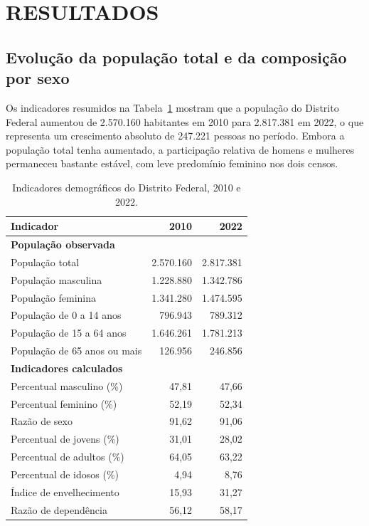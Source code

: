 \documentclass[a4paper,12pt]{article}
\begin{document}
\section{RESULTADOS}



\subsection{Evolução da população total e da composição por sexo}

Os indicadores resumidos na Tabela~\ref{tab:indicadores_df} mostram que a
população do Distrito Federal aumentou de 2.570.160 habitantes em 2010 para
2.817.381 em 2022, o que representa um crescimento absoluto de 247.221 pessoas
no período. Embora a população total tenha aumentado, a participação relativa
de homens e mulheres permaneceu bastante estável, com leve predomínio feminino
nos dois censos.

\begin{table}[H]
\small
\centering
\caption{Indicadores demográficos do Distrito Federal, 2010 e 2022.}
\label{tab:indicadores_df}
\begin{tabular}{lrr}
\toprule
Indicador & 2010 & 2022 \\
\midrule
\multicolumn{3}{l}{\textbf{População observada}} \\
População total & 2.570.160 & 2.817.381 \\
População masculina & 1.228.880 & 1.342.786 \\
População feminina & 1.341.280 & 1.474.595 \\
População de 0 a 14 anos & 796.943 & 789.312 \\
População de 15 a 64 anos & 1.646.261 & 1.781.213 \\
População de 65 anos ou mais & 126.956 & 246.856 \\
\midrule
\multicolumn{3}{l}{\textbf{Indicadores calculados}} \\
Percentual masculino (\%) & 47,81 & 47,66 \\
Percentual feminino (\%) & 52,19 & 52,34 \\
Razão de sexo & 91,62 & 91,06 \\
Percentual de jovens (\%) & 31,01 & 28,02 \\
Percentual de adultos (\%) & 64,05 & 63,22 \\
Percentual de idosos (\%) & 4,94 & 8,76 \\
Índice de envelhecimento & 15,93 & 31,27 \\
Razão de dependência & 56,12 & 58,17 \\
\bottomrule
\end{tabular}
\end{table}
\end{document}
